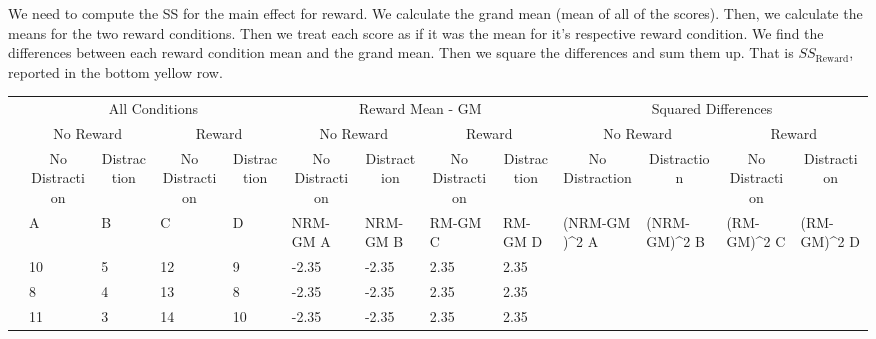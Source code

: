 \documentclass[
]{book}
\begin{document}
We need to compute the SS for the main effect for reward. We calculate the grand mean (mean of all of the scores). Then, we calculate the means for the two reward conditions. Then we treat each score as if it was the mean for it's respective reward condition. We find the differences between each reward condition mean and the grand mean. Then we square the differences and sum them up. That is \(SS_\text{Reward}\), reported in the bottom yellow row.

\begin{table}
\centering
\begin{tabular}{l|l|l|l|l|l|l|l|l|>{}l|>{}l|>{}l|>{}l}
\hline
\multicolumn{1}{c|}{ } & \multicolumn{4}{c|}{All Conditions} & \multicolumn{4}{c|}{Reward Mean - GM} & \multicolumn{4}{c}{Squared Differences} \\
\cline{2-5} \cline{6-9} \cline{10-13}
\multicolumn{1}{c|}{ } & \multicolumn{2}{c|}{No Reward} & \multicolumn{2}{c|}{Reward} & \multicolumn{2}{c|}{No Reward} & \multicolumn{2}{c|}{Reward} & \multicolumn{2}{c|}{No Reward} & \multicolumn{2}{c}{Reward} \\
\cline{2-3} \cline{4-5} \cline{6-7} \cline{8-9} \cline{10-11} \cline{12-13}
\multicolumn{1}{c|}{ } & \multicolumn{1}{c|}{No Distraction} & \multicolumn{1}{c|}{Distraction} & \multicolumn{1}{c|}{No Distraction} & \multicolumn{1}{c|}{Distraction} & \multicolumn{1}{c|}{No Distraction} & \multicolumn{1}{c|}{Distraction} & \multicolumn{1}{c|}{No Distraction} & \multicolumn{1}{c|}{Distraction} & \multicolumn{1}{c|}{No Distraction} & \multicolumn{1}{c|}{Distraction} & \multicolumn{1}{c|}{No Distraction} & \multicolumn{1}{c}{Distraction} \\
\cline{2-2} \cline{3-3} \cline{4-4} \cline{5-5} \cline{6-6} \cline{7-7} \cline{8-8} \cline{9-9} \cline{10-10} \cline{11-11} \cline{12-12} \cline{13-13}
  & A & B & C & D & NRM-GM A & NRM-GM B & RM-GM C & RM-GM D & (NRM-GM )\textasciicircum{}2 A & (NRM-GM)\textasciicircum{}2 B & (RM-GM)\textasciicircum{}2 C & (RM-GM)\textasciicircum{}2 D\\
\hline
 & 10 & 5 & 12 & 9 & -2.35 & -2.35 & 2.35 & 2.35 & \cellcolor{yellow}{5.5225} & \cellcolor{yellow}{5.5225} & \cellcolor{yellow}{5.5225} & \cellcolor{yellow}{5.5225}\\
\hline
 & 8 & 4 & 13 & 8 & -2.35 & -2.35 & 2.35 & 2.35 & \cellcolor{yellow}{5.5225} & \cellcolor{yellow}{5.5225} & \cellcolor{yellow}{5.5225} & \cellcolor{yellow}{5.5225}\\
\hline
 & 11 & 3 & 14 & 10 & -2.35 & -2.35 & 2.35 & 2.35 & \cellcolor{yellow}{5.5225} & \cellcolor{yellow}{5.5225} & \cellcolor{yellow}{5.5225} & \cellcolor{yellow}{5.5225}\\

\end{tabular}
\end{table}
\end{document}
